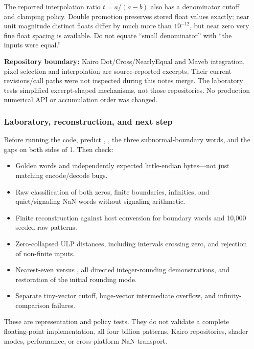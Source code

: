 The reported interpolation ratio \(t=a/(a-b)\) also has a denominator cutoff and clamping policy. Double promotion preserves stored float values exactly; near unit magnitude distinct floats differ by much more than \(10^{-12}\), but near zero very fine float spacing is available. Do not equate ``small denominator'' with ``the inputs were equal.''

\textbf{Repository boundary:} Kairo Dot/Cross/NearlyEqual and Maveb integration, pixel selection and interpolation are source-reported excerpts. Their current revisions/call paths were not inspected during this notes merge. The laboratory tests simplified excerpt-shaped mechanisms, not those repositories. No production numerical API or accumulation order was changed.

\subsubsection{Laboratory, reconstruction, and next step}\label{01-foundations-i-ch001-laboratory-reconstruction-and-next-step}

\hypertarget{01-foundations-i-ch001-laboratory-reconstruction-and-next-step}{}

Before running the code, predict , , the three subnormal-boundary words, and the gaps on both sides of 1. Then check:

\begin{itemize}
\tightlist
\item
  Golden words and independently expected little-endian bytes---not just matching encode/decode bugs.
\item
  Raw classification of both zeros, finite boundaries, infinities, and quiet/signaling NaN words without signaling arithmetic.
\item
  Finite reconstruction against host conversion for boundary words and 10,000 seeded raw patterns.
\item
  Zero-collapsed ULP distances, including intervals crossing zero, and rejection of non-finite inputs.
\item
  Nearest-even versus , all directed integer-rounding demonstrations, and restoration of the initial rounding mode.
\item
  Separate tiny-vector cutoff, huge-vector intermediate overflow, and infinity-comparison failures.
\end{itemize}

These are representation and policy tests. They do not validate a complete floating-point implementation, all four billion patterns, Kairo repositories, shader modes, performance, or cross-platform NaN transport.

